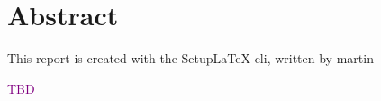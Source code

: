 \section*{Abstract}

This report is created with the SetupLaTeX \acrshort{cli}, written by \gls{martin}

\textcolor{purple}{TBD}

\clearpage
